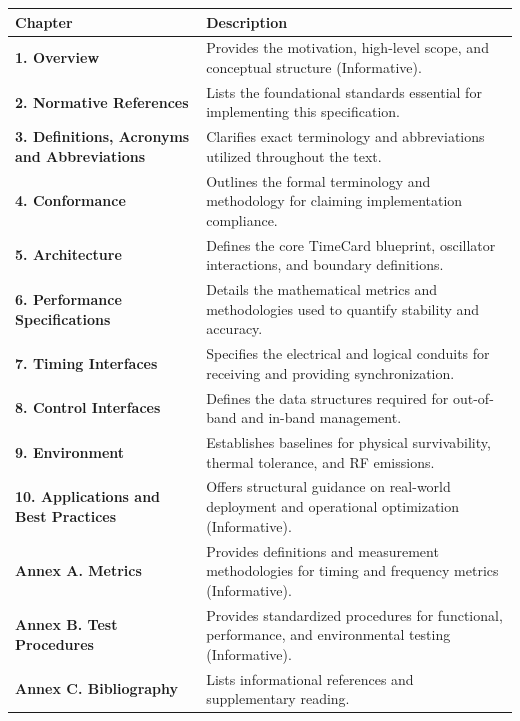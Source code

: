 \documentclass[
]{article}
\newcounter{none} %
\begin{document}
{\def\LTcaptype{none} %
\begin{longtable}[]{@{}
  >{\raggedright\arraybackslash}p{}
  >{\raggedright\arraybackslash}p{}@{}}
\toprule\noalign{}
Chapter & Description \\
\midrule\noalign{}
\endhead
\bottomrule\noalign{}
\endlastfoot
\textbf{1. Overview} & Provides the motivation, high-level scope, and
conceptual structure (Informative). \\
\textbf{2. Normative References} & Lists the foundational standards
essential for implementing this specification. \\
\textbf{3. Definitions, Acronyms and Abbreviations} & Clarifies exact
terminology and abbreviations utilized throughout the text. \\
\textbf{4. Conformance} & Outlines the formal terminology and
methodology for claiming implementation compliance. \\
\textbf{5. Architecture} & Defines the core TimeCard blueprint,
oscillator interactions, and boundary definitions. \\
\textbf{6. Performance Specifications} & Details the mathematical
metrics and methodologies used to quantify stability and accuracy. \\
\textbf{7. Timing Interfaces} & Specifies the electrical and logical
conduits for receiving and providing synchronization. \\
\textbf{8. Control Interfaces} & Defines the data structures required
for out-of-band and in-band management. \\
\textbf{9. Environment} & Establishes baselines for physical
survivability, thermal tolerance, and RF emissions. \\
\textbf{10. Applications and Best Practices} & Offers structural
guidance on real-world deployment and operational optimization
(Informative). \\
\textbf{Annex A. Metrics} & Provides definitions and measurement
methodologies for timing and frequency metrics (Informative). \\
\textbf{Annex B. Test Procedures} & Provides standardized procedures for
functional, performance, and environmental testing (Informative). \\
\textbf{Annex C. Bibliography} & Lists informational references and
supplementary reading. \\
\end{longtable}
}
\end{document}
